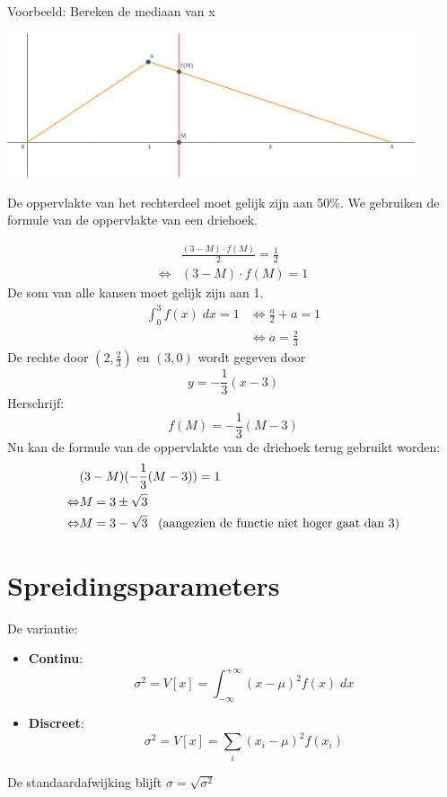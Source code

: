 \documentclass[12pt]{report}
\newcommand{\example}[2]{
      \hrulefill
      
      Voorbeeld: #1
      
      #2
      
      \hrulefill
  }
\begin{document}
\example{Bereken de mediaan van x
\begin{center}
 \includegraphics[width=0.90\textwidth]{oef_mediaan}
\end{center}
}{
De oppervlakte van het rechterdeel moet gelijk zijn aan 50\%. We gebruiken de formule van de oppervlakte van een driehoek.

\begin{equation*}
 \begin{split}
  &  \frac{(3 - M) \cdot f(M)}{2} = \frac{1}{2} \\
  \Leftrightarrow & (3 - M) \cdot f(M) = 1
 \end{split}
\end{equation*}
De som van alle kansen moet gelijk zijn aan 1.
\begin{equation*}
 \begin{split}
  \int_{0}^{3}f(x)\;dx = 1 & \Leftrightarrow \frac{a}{2} + a = 1\\
  & \Leftrightarrow a = \frac{2}{3}
 \end{split}
\end{equation*}
De rechte door $(2, \frac{2}{3})$ en $(3, 0)$ wordt gegeven door 
$$y = -\frac{1}{3}(x-3)$$
Herschrijf:
$$f(M) = -\frac{1}{3}(M - 3)$$
Nu kan de formule van de oppervlakte van de driehoek terug gebruikt worden:
\begin{equation*}
 \begin{split}
  & (3 - M)(-\frac{1}{3}(M - 3)) = 1  \\
  \Leftrightarrow & M = 3 \pm \sqrt{3}\\
  \Leftrightarrow & M = 3 - \sqrt{3} \;\;\;\hbox{(aangezien de functie niet hoger gaat dan 3)}
  \end{split}
\end{equation*}
}

\section{Spreidingsparameters}
De variantie:
\begin{itemize}
 \item \textbf{Continu}: $$\sigma^2 = V[x] = \int_{-\infty}^{+\infty}(x-\mu)^2 f(x)\; dx$$
 \item \textbf{Discreet}: $$\sigma^2 = V[x] = \sum_{i}(x_i - \mu)^2 f(x_i)$$
\end{itemize}
De standaardafwijking blijft $\sigma = \sqrt{\sigma^2}$
\end{document}
